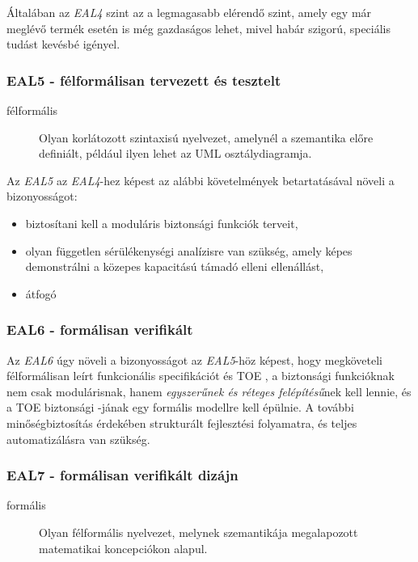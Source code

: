Általában az \emph{EAL4} szint az a legmagasabb elérendő szint, amely egy már meglévő termék esetén
is még gazdaságos lehet, mivel habár szigorú, speciális tudást kevésbé igényel.

\subsubsection{EAL5 - félformálisan tervezett és tesztelt}
\begin{description}
    \item[félformális]{Olyan korlátozott szintaxisú nyelvezet, amelynél a szemantika előre
        definiált, például ilyen lehet az UML osztálydiagramja.}
\end{description}

Az \emph{EAL5} az \emph{EAL4}-hez képest az alábbi követelmények betartatásával növeli
a bizonyosságot:
\begin{itemize}
    \item biztosítani kell a moduláris biztonsági funkciók terveit,
    \item olyan független sérülékenységi analízisre van szükség, amely képes demonstrálni a közepes
        kapacitású támadó elleni ellenállást,
    \item átfogó 
\end{itemize}

\subsubsection{EAL6 - formálisan verifikált}
Az \emph{EAL6} úgy növeli a bizonyosságot az \emph{EAL5}-höz képest, hogy megköveteli félformálisan
leírt funkcionális specifikációt és TOE , a biztonsági funkcióknak nem csak modulárisnak, hanem
\emph{egyszerűnek és réteges felépítésű}nek kell lennie, és a TOE biztonsági
-jának egy formális modellre kell épülnie.
A további minőségbiztosítás érdekében strukturált fejlesztési folyamatra, és teljes automatizálásra
van szükség.

\subsubsection{EAL7 - formálisan verifikált dizájn}
\begin{description}
    \item[formális]{Olyan félformális nyelvezet, melynek szemantikája megalapozott matematikai
        koncepciókon alapul.}
\end{description}




